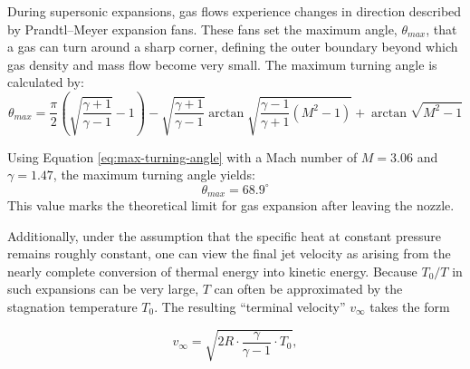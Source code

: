 		During supersonic expansions, gas flows experience changes in direction described by Prandtl–Meyer expansion fans.
		These fans set the maximum angle, $\theta_{max}$, that a gas can turn around a sharp corner, defining the outer boundary beyond which gas density and mass flow become very small.
		The maximum turning angle is calculated by:
		\begin{equation}
			\theta_{max} = \frac{\pi}{2} \left(\sqrt{\frac{\gamma + 1}{\gamma - 1}} - 1\right) - \sqrt{\frac{\gamma + 1}{\gamma - 1}}\arctan{\sqrt{\frac{\gamma - 1}{\gamma + 1}(M^2 - 1)}} + \arctan{\sqrt{M^2 -1}}
			\label{eq:max-turning-angle}
		\end{equation}

		Using Equation \eqref{eq:max-turning-angle} with a Mach number of $M=3.06$ and $\gamma=1.47$, the maximum turning angle yields:
		$$
			\theta_{max} = 68.9^\circ
		$$
		This value marks the theoretical limit for gas expansion after leaving the nozzle.

		Additionally, under the assumption that the specific heat at constant pressure remains roughly constant, one can view the final jet velocity as arising from the nearly complete conversion of thermal energy into kinetic energy.
		Because $T_0 / T$ in such expansions can be very large, $T$ can often be approximated by the stagnation temperature $T_0$.
		The resulting “terminal velocity” $v_{\infty}$ takes the form

		\begin{equation}
			v_{\infty} = \sqrt{2R \cdot \frac{\gamma}{\gamma - 1} \cdot T_0},
		\end{equation}

